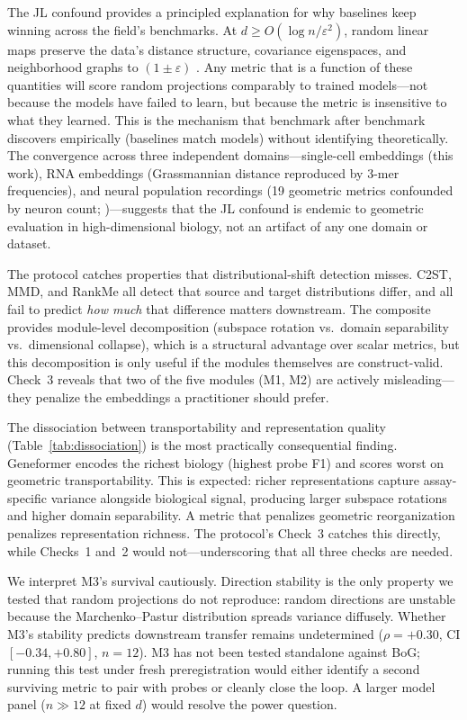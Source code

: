 \documentclass[9pt,lineno]{elife}
\begin{document}
The JL confound provides a principled explanation for why baselines keep winning across the field's benchmarks. At $d \geq O(\log n / \varepsilon^2)$, random linear maps preserve the data's distance structure, covariance eigenspaces, and neighborhood graphs to $(1 \pm \varepsilon)$ \citep{johnsonlindenstrauss1984}. Any metric that is a function of these quantities will score random projections comparably to trained models---not because the models have failed to learn, but because the metric is insensitive to what they learned. This is the mechanism that benchmark after benchmark discovers empirically (baselines match models) without identifying theoretically. The convergence across three independent domains---single-cell embeddings (this work), RNA embeddings (Grassmannian distance reproduced by 3-mer frequencies), and neural population recordings (19 geometric metrics confounded by neuron count; \citealp{tower2026bracket})---suggests that the JL confound is endemic to geometric evaluation in high-dimensional biology, not an artifact of any one domain or dataset.

The protocol catches properties that distributional-shift detection misses. C2ST, MMD, and RankMe all detect that source and target distributions differ, and all fail to predict \emph{how much} that difference matters downstream. The composite provides module-level decomposition (subspace rotation vs.\ domain separability vs.\ dimensional collapse), which is a structural advantage over scalar metrics, but this decomposition is only useful if the modules themselves are construct-valid. Check~3 reveals that two of the five modules (M1, M2) are actively misleading---they penalize the embeddings a practitioner should prefer.

The dissociation between transportability and representation quality (Table~\ref{tab:dissociation}) is the most practically consequential finding. Geneformer encodes the richest biology (highest probe F1) and scores worst on geometric transportability. This is expected: richer representations capture assay-specific variance alongside biological signal, producing larger subspace rotations and higher domain separability. A metric that penalizes geometric reorganization penalizes representation richness. The protocol's Check~3 catches this directly, while Checks~1 and~2 would not---underscoring that all three checks are needed.

We interpret M3's survival cautiously. Direction stability is the only property we tested that random projections do not reproduce: random directions are unstable because the Marchenko--Pastur distribution spreads variance diffusely. Whether M3's stability predicts downstream transfer remains undetermined ($\rho = +0.30$, CI $[-0.34, +0.80]$, $n = 12$). M3 has not been tested standalone against BoG; running this test under fresh preregistration would either identify a second surviving metric to pair with probes or cleanly close the loop. A larger model panel ($n \gg 12$ at fixed $d$) would resolve the power question.
\end{document}
